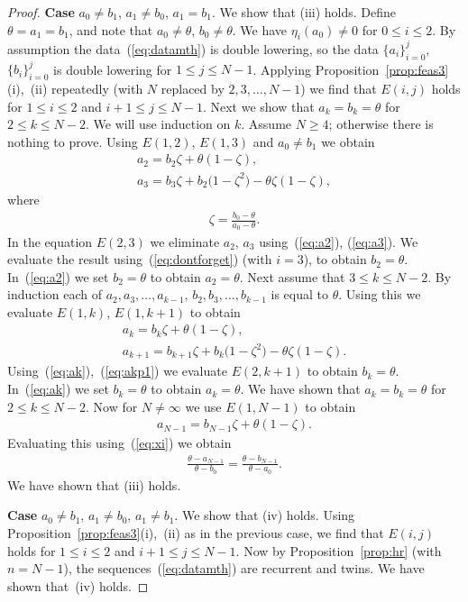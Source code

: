 \documentclass[pdftex]{sigma}
\numberwithin{equation}{section}
\begin{document}
\begin{proof}
{\bf Case}
$a_0 \not = b_1$,
$a_1 \not = b_0$,
$a_1 = b_1$.
We show that (iii) holds.
Define $\theta=a_1=b_1$, and note that $a_0 \not=\theta$,
$b_0 \not=\theta$.
We have $\eta_i(a_0)\not=0$ for $0 \leq i \leq 2$.
By assumption the data~(\ref{eq:datamth}) is double lowering,
so the data
$\lbrace a_i \rbrace_{i=0}^j$,
$\lbrace b_i \rbrace_{i=0}^j$ is double lowering for
$1 \leq j\leq N-1$. Applying Proposition~\ref{prop:feas3}(i),~(ii) repeatedly
(with $N$ replaced by $2,3,\ldots, N-1$) we find that
$E(i,j)$ holds for $1 \leq i \leq 2$
and $i+1\leq j\leq N-1$.
Next we show that $a_k=b_k=\theta$ for $2 \leq k \leq N-2$.
We will use induction on $k$. Assume $N\geq 4$; otherwise
there is nothing to prove.
Using $E(1,2)$, $E(1,3)$
and
$a_0 \not=b_1$
we obtain
\begin{gather}
a_2 = b_2 \zeta + \theta (1-\zeta),\label{eq:a2}
\\
a_{3} = b_{3} \zeta + b_2 \big(1-\zeta^2\big) -\theta \zeta (1-\zeta),\label{eq:a3}
\end{gather}
where
\begin{gather}
\zeta=\frac{b_0-\theta}{a_0-\theta}.\label{eq:xi}
\end{gather}
In the equation $E(2,3)$ we eliminate $a_2$, $a_3$ using~(\ref{eq:a2}),
(\ref{eq:a3}). We evaluate the result using~(\ref{eq:dontforget}) (with $i=3$), to obtain
$b_2=\theta$.
In~(\ref{eq:a2}) we set $b_2=\theta$
to obtain $a_2=\theta$.
Next assume that $3 \leq k \leq N-2$.
By induction each of
 $a_2,a_3,\ldots, a_{k-1}$,
 $b_2,b_3,\ldots, b_{k-1}$ is equal to $\theta$.
Using this we evaluate $E(1,k)$, $E(1,k+1)$ to obtain
\begin{gather}
a_k = b_k \zeta + \theta (1-\zeta),\label{eq:ak}\\
a_{k+1} = b_{k+1} \zeta + b_k \big(1-\zeta^2\big) -\theta \zeta (1-\zeta).\label{eq:akp1}
\end{gather}
Using~(\ref{eq:ak}),~(\ref{eq:akp1}) we evaluate $E(2,k+1)$ to obtain
$b_k=\theta$. In~(\ref{eq:ak})
we set $b_k=\theta$
to obtain $a_k=\theta$.
We have shown that
$a_k = b_k = \theta$ for $2 \leq k \leq N-2$.
Now for $N\not=\infty$ we use $E(1,N-1)$
to obtain
\begin{gather*}
a_{N-1} = b_{N-1} \zeta + \theta (1-\zeta).
\end{gather*}
Evaluating this using~(\ref{eq:xi}) we obtain
\begin{gather*}
\frac{\theta- a_{N-1}}{\theta-b_0} =\frac{\theta- b_{N-1}}{\theta-a_0}.
\end{gather*}
We have shown that (iii) holds.

{\bf Case} $a_0 \not = b_1$,
$a_1 \not = b_0$,
$a_1 \not= b_1$.
We show that (iv) holds.
Using Proposition~\ref{prop:feas3}(i),~(ii)
as in the previous case, we find that
$E(i,j)$ holds for $1 \leq i \leq 2$
and $i+1\leq j\leq N-1$.
Now by Proposition~\ref{prop:hr}
(with $n=N-1$),
the sequences~(\ref{eq:datamth}) are recurrent and twins.
We have shown that~(iv) holds.
\end{proof}
\end{document}
